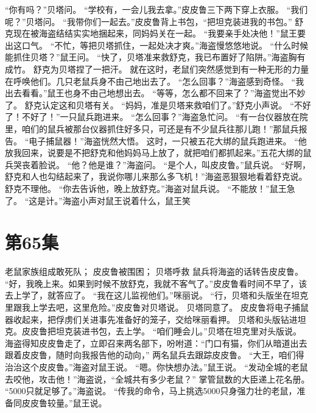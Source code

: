 \documentclass[a4paper,12pt,UTF8,twoside]{ctexbook}
\begin{document}
        “你有吗？”贝塔问。 
        “学校有，一会儿我去拿。”皮皮鲁三下两下穿上衣服。 
        “我们呢？”贝塔问。 
        “我带你们一起去。”皮皮鲁背上书包，“把坦克装进我的书包。” 
        舒克现在被海盗结结实实地捆起来，同妈妈关在一起。 
        “我要亲手处决他！”鼠王要出这口气。 
        “不忙，等把贝塔抓住，一起处决才爽。”海盗慢悠悠地说。 
        “什么时候能抓住贝塔？”鼠王问。 
        “快了，贝塔准来救舒克，我已布置好了陷阱。”海盗胸有成竹。 
        舒克为贝塔捏了一把汗。 
        就在这时，老鼠们突然感觉到有一种无形的力量在呼唤他们。几只老鼠兵身不由己地出去了。 
        “怎么回事？”海盗感到奇怪。 
        “我出去看看。”鼠王也身不由己地想出去。 
        “等等，怎么都不回来了？”海盗觉出不妙了。 
        舒克认定这和贝塔有关。 
        “妈妈，准是贝塔来救咱们了。”舒克小声说。 
        “不好了！不好了！”一只鼠兵跑进来。 
        “怎么回事？”海盗急忙问。 
        “有一台仪器放在院里，咱们的鼠兵被那台仪器抓住好多只，可还是有不少鼠兵往那儿跑！”那鼠兵报告。 
        “电子捕鼠器！”海盗恍然大悟。 
        这时，一只被五花大绑的鼠兵跑进来。 
        “他放我回来，说要是不把舒克和他妈妈马上放了，就把咱们都抓起来。”五花大绑的鼠兵哭丧着脸说。 
        “他？他是谁？”海盗问。 
        “是个人，叫皮皮鲁。”鼠兵说。 
        “好啊，舒克和人也勾结起来了，我说你哪儿来那么多飞机！”海盗恶狠狠地看着舒克说。 
        舒克不理他。 
        “你去告诉他，晚上放舒克。”海盗对鼠兵说。 
        “不能放！”鼠王急了。 
        “这是计。”海盗小声对鼠王说着什么，鼠王笑   \chapter{第65集} 
        老鼠家族组成敢死队； 
        皮皮鲁被围困； 
        贝塔呼救   
        鼠兵将海盗的话转告皮皮鲁。 
        “好，我晚上来。如果到时候不放舒克，我就不客气了。”皮皮鲁看时间不早了，该去上学了，就答应了。 
        “我在这儿监视他们。”咪丽说。 
        “行，贝塔和头版坐在坦克里跟我上学去吧，这里危险。”皮皮鲁对贝塔说。 
        贝塔同意了。 
        皮皮鲁将电子捕鼠器收起来，把俘虏们关进事先准备好的笼子，交给咪丽看押。 
        贝塔和头版钻进坦克。皮皮鲁把坦克装进书包，去上学。 
        “咱们睡会儿。”贝塔在坦克里对头版说。 
        海盗得知皮皮鲁走了，立即召来两名部下，吩咐道：“门口有猫，你们从暗道出去跟着皮皮鲁，随时向我报告他的动向，” 
        两名鼠兵去跟踪皮皮鲁。 
        “大王，咱们得治治这个皮皮鲁。”海盗对鼠王说。 
        “嗯。你快想办法。”鼠王说。 
        “发动全城的老鼠去咬他，攻击他！”海盗说，“全城共有多少老鼠？” 
        掌管鼠数的大臣递上花名册。 
        “5000只就足够了。”海盗说。 
        “传我的命令，马上挑选5000只身强力壮的老鼠，准备同皮皮鲁较量。”鼠王说。 
\end{document}
